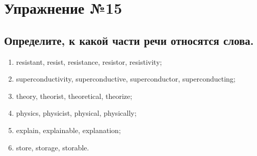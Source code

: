 \section{Упражнение №15}
\subsection*{Определите, к какой части речи относятся слова.}
\begin{enumerate}
      \item resistant, resist, resistance, resistor, resistivity;
      \item superconductivity, superconductive, superconductor, superconducting;
      \item theory, theorist, theoretical, theorize;
      \item physics, physicist, physical, physically;
      \item explain, explainable, explanation;
      \item store, storage, storable.
\end{enumerate}

